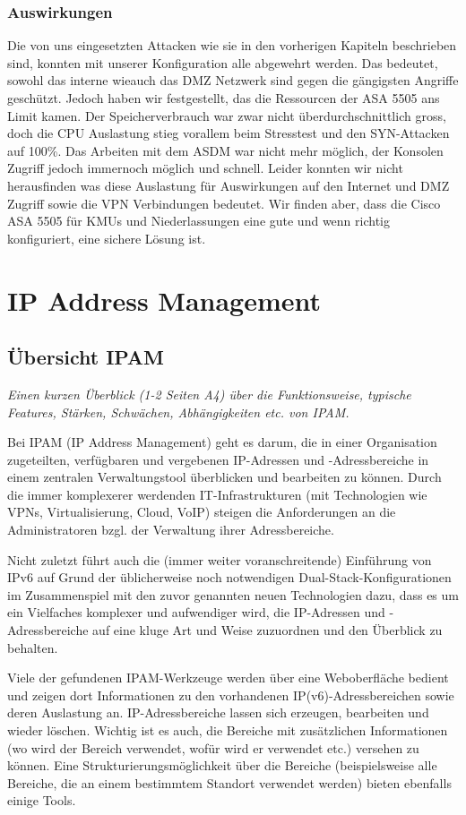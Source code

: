 \documentclass[11pt,a4paper,parskip=half]{scrartcl}
\begin{document}
\subsubsection{Auswirkungen}
Die von uns eingesetzten Attacken wie sie in den vorherigen Kapiteln beschrieben sind, konnten mit unserer Konfiguration alle abgewehrt werden. Das bedeutet, sowohl das interne wieauch das DMZ Netzwerk sind gegen die gängigsten Angriffe geschützt. Jedoch haben wir festgestellt, das die Ressourcen der ASA 5505 ans Limit kamen. Der Speicherverbrauch war zwar nicht überdurchschnittlich gross, doch die CPU Auslastung stieg vorallem beim Stresstest und den SYN-Attacken auf 100\%. Das Arbeiten mit dem ASDM war nicht mehr möglich, der Konsolen Zugriff jedoch immernoch möglich und schnell. Leider konnten wir nicht herausfinden was diese Auslastung für Auswirkungen auf den Internet und DMZ Zugriff sowie die VPN Verbindungen bedeutet. Wir finden aber, dass die Cisco ASA 5505 für KMUs und Niederlassungen eine gute und wenn richtig konfiguriert, eine sichere Lösung ist.

\newpage
\section{IP Address Management}
\subsection{Übersicht IPAM}
\textit{Einen kurzen Überblick (1-2 Seiten A4) über die Funktionsweise, typische Features, Stärken, Schwächen, Abhängigkeiten etc. von IPAM.}

Bei IPAM (IP Address Management) geht es darum, die in einer Organisation zugeteilten, verfügbaren und vergebenen IP-Adressen und -Adressbereiche in einem zentralen Verwaltungstool überblicken und bearbeiten zu können. Durch die immer komplexerer werdenden IT-Infrastrukturen (mit Technologien wie VPNs, Virtualisierung, Cloud, VoIP) steigen die Anforderungen an die Administratoren bzgl. der Verwaltung \glqq{}ihrer\grqq{} Adressbereiche.

Nicht zuletzt führt auch die (immer weiter voranschreitende) Einführung von IPv6 auf Grund der üblicherweise noch notwendigen Dual-Stack-Konfigurationen im Zusammenspiel mit den zuvor genannten neuen Technologien dazu, dass es um ein Vielfaches komplexer und aufwendiger wird, die IP-Adressen und -Adressbereiche auf eine kluge Art und Weise zuzuordnen und den Überblick zu behalten.

Viele der gefundenen IPAM-Werkzeuge werden über eine Weboberfläche bedient und zeigen dort Informationen zu den vorhandenen IP(v6)-Adressbereichen sowie deren Auslastung an. IP-Adressbereiche lassen sich erzeugen, bearbeiten und wieder löschen. Wichtig ist es auch, die Bereiche mit zusätzlichen Informationen (wo wird der Bereich verwendet, wofür wird er verwendet etc.) versehen zu können. Eine Strukturierungsmöglichkeit über die Bereiche (beispielsweise alle Bereiche, die an einem bestimmtem Standort verwendet werden) bieten ebenfalls einige Tools.
\end{document}
